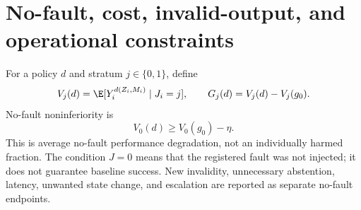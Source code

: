 \section{No-fault, cost, invalid-output, and operational constraints}
\label{sec:constraints}

For a policy $d$ and stratum $j\in\{0,1\}$, define
\begin{equation}
 V_j(d)=\E[Y_i^{d(Z_i,M_i)}\mid J_i=j],\qquad
 G_j(d)=V_j(d)-V_j(g_0).
 \label{eq:stratum-values}
\end{equation}
No-fault noninferiority is
\begin{equation}
 V_0(d)\ge V_0(g_0)-\eta.
 \label{eq:noninferiority}
\end{equation}
This is average no-fault performance degradation, not an individually harmed
fraction.  The condition $J=0$ means that the registered fault was not injected;
it does not guarantee baseline success.  New invalidity, unnecessary
abstention, latency, unwanted state change, and escalation are reported as
separate no-fault endpoints.

